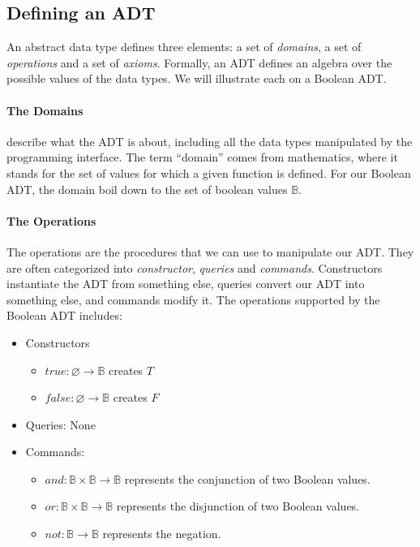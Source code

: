 \documentclass{aldast}
\begin{document}
\subsection{Defining an ADT}

An abstract data type defines three elements: a set of \emph{domains},
a set of \emph{operations} and a set of \emph{axioms}. Formally, an
ADT defines an algebra over the possible values of the data types. We
will illustrate each on a Boolean ADT.

\paragraph{The Domains} describe what the ADT is about, including all
the data types manipulated by the programming interface. The term
``domain'' comes from mathematics, where it stands for the set of values for
which a given function is defined. For our Boolean ADT, the domain
boil down to the set of boolean values $\mathbb{B}$.

\paragraph{The Operations} The operations are the procedures that we
can use to manipulate our ADT. They are often categorized into
\emph{constructor}, \emph{queries} and \emph{commands}. Constructors
instantiate the ADT from something else, queries convert our ADT into
something else, and commands modify it. The operations supported by
the Boolean ADT includes:
\begin{itemize}
\item Constructors
  \begin{itemize}
  \item $true: \varnothing \to \mathbb{B}$ creates $T$
  \item $false: \varnothing \to \mathbb{B}$ creates $F$
  \end{itemize}
\item Queries: None
\item Commands:
  \begin{itemize}
  \item $and: \mathbb{B} \times \mathbb{B} \to \mathbb{B}$ represents the conjunction of two Boolean values.
  \item $or: \mathbb{B} \times \mathbb{B} \to \mathbb{B}$ represents the disjunction of two Boolean values.
  \item $not: \mathbb{B} \to \mathbb{B}$ represents the negation.
  \end{itemize}
\end{itemize}
\end{document}
